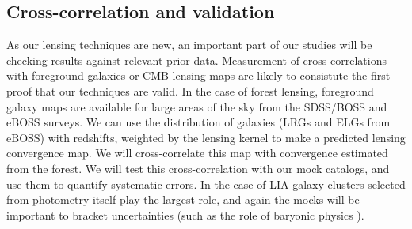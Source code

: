 \subsection{Cross-correlation and validation}
As our lensing techniques are new, an important part of our studies will
be checking results against relevant prior data.
Measurement of cross-correlations with foreground galaxies or CMB
lensing maps are likely to consistute the first proof that our
techniques are valid.
 In the case of forest lensing,
foreground galaxy maps are available for large areas of the sky from the
SDSS/BOSS and eBOSS surveys. We can use the distribution of galaxies 
(LRGs and ELGs from eBOSS) with redshifts,
weighted by the lensing kernel to make a predicted lensing
convergence  map. We will
 cross-correlate this map with convergence estimated from the forest. 
We will test this cross-correlation with our mock catalogs, and use
them to quantify systematic errors. In the case of LIA galaxy
clusters selected from photometry itself play the largest role,
and again the mocks will be important to bracket uncertainties 
(such as the role of baryonic physics  \cite{zentner2013}).


